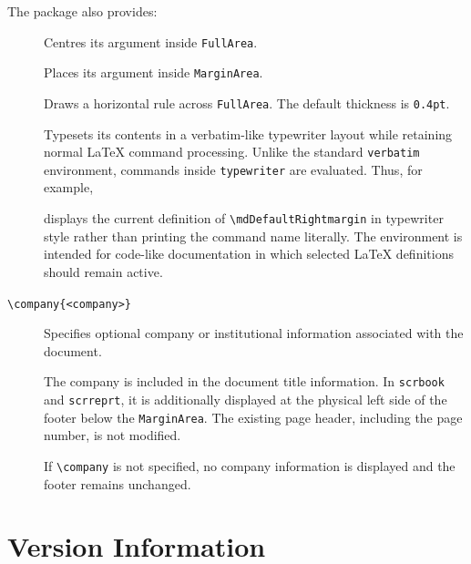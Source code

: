 \documentclass[
11pt,
a4paper,
oneside
]{scrbook}
\begin{document}
The package also provides:

\newcommand*{\cmdsyntax}[1]{%
	\texttt{\detokenize{#1}}%
}

\begin{description}
	
	\item[]
	Centres its argument inside \texttt{FullArea}.
	
	\item[]
	Places its argument inside \texttt{MarginArea}.
	
	\item[]
	Draws a horizontal rule across \texttt{FullArea}.
	The default thickness is \texttt{0.4pt}.
	
	\item[]
	Typesets its contents in a verbatim-like typewriter layout while
	retaining normal \LaTeX{} command processing.
	Unlike the standard \texttt{verbatim} environment, commands inside
	\texttt{typewriter} are evaluated. Thus, for example,	




	displays the current definition of
	\texttt{\textbackslash{}mdDefaultRightmargin} in typewriter style rather than
	printing the command name literally.
	The environment is intended for code-like documentation in which
	selected \LaTeX{} definitions should remain active.
	
	\item[\texttt{\textbackslash{}company\{<company>\}}]
	Specifies optional company or institutional information associated
	with the document.
	
	The company is included in the document title information. In
	\texttt{scrbook} and \texttt{scrreprt}, it is additionally displayed
	at the physical left side of the footer below the \texttt{MarginArea}.
	The existing page header, including the page number, is not modified.
	
	If \texttt{\textbackslash{}company} is not specified, no company information
	is displayed and the footer remains unchanged.
	
\end{description}
	

\chapter{Version Information}
\label{chap:version-information}
\end{document}

